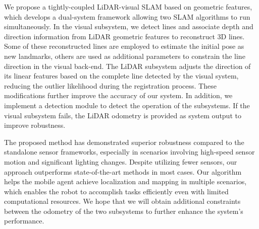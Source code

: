 We propose a tightly-coupled LiDAR-visual SLAM based on geometric features, which develops a dual-system framework allowing two SLAM algorithms to run simultaneously. In the visual subsystem, we detect lines and associate depth and direction information from LiDAR geometric features to reconstruct 3D lines. Some of these reconstructed lines are employed to estimate the initial pose as new landmarks, others are used as additional parameters to constrain the line direction in the visual back-end. The LiDAR subsystem adjusts the direction of its linear features based on the complete line detected by the visual system, reducing the outlier likelihood during the registration process. These modifications further improve the accuracy of our system. In addition, we implement a detection module to detect the operation of the subsystems. If the visual subsystem fails, the LiDAR odometry is provided as system output to improve robustness.

The proposed method has demonstrated superior robustness compared to the standalone sensor frameworks, especially in scenarios involving high-speed sensor motion and significant lighting changes. Despite utilizing fewer sensors, our approach outperforms state-of-the-art methods in most cases. Our algorithm helps the mobile agent achieve localization and mapping in multiple scenarios, which enables the robot to accomplish tasks efficiently even with limited computational resources. We hope that we will obtain additional constraints between the odometry of the two subsystems to further enhance the system's performance.